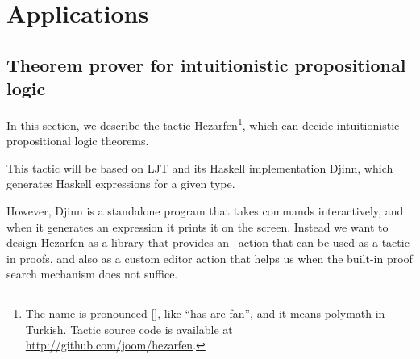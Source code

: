 \chapter{Applications} \label{chap:applications}

\section{Theorem prover for intuitionistic propositional logic}\label{sec:hezarfen}

In this section, we describe the tactic Hezarfen\footnote{ The name is
  pronounced {[]}, like ``has are fan'', and it means
    polymath in Turkish.  Tactic source code is available at
    \url{http://github.com/joom/hezarfen}.}, which can decide intuitionistic
propositional logic theorems.

This tactic will be based on LJT\cite{ljt} and its Haskell
implementation Djinn\cite{djinn}, which generates Haskell expressions
for a given type.

However, Djinn is a standalone program that takes commands
interactively, and when it generates an expression it prints it on the screen.
Instead we want to design Hezarfen as a library that provides an \Elab\ action
that can be used as a tactic in proofs, and also as a custom editor action that
helps us when the built-in proof search mechanism does not suffice.





